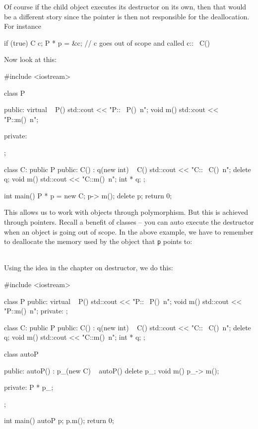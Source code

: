 Of course if the child object executes its destructor on its own, then
that would be a different story since the pointer is then not responsible for
the deallocation. For instance
\begin{console}
if (true)
{   
    C c;
    P * p = &c;
}   // c goes out of scope and called c::~ C()

\newpage{}

Now look at this:

\begin{console}
#include <iostream>

class P
{
public:
     virtual ~ P() { std::cout << "P::~ P()\ n"; }
     void m() { std::cout << "P::m()\ n"; }
     
private:
};

class C: public P
{
public:
     C() : q(new int) {}
     ~ C() { std::cout <<
     "C::~ C()\ n"; delete q; }
     void m() { std::cout << "C::m()\ n"; }
     int * q;
};

int main()
{   
    P * p = new C;
    p-> m();
    delete p;
    return 0;
}
\end{console}

This allows us to work with objects through polymorphism. But this is achieved through pointers. Recall a benefit of classes -- you can auto execute the destructor when an object is going out of scope. In the above example, we have to remember to deallocate the memory used by the object that \texttt{p} points to:

\\

Using the idea in the chapter on destructor, we do this:

\begin{console}
#include <iostream>

class P
{
public:
     virtual ~ P() { std::cout << "P::~ P()\ n"; }
     void m() { std::cout << "P::m()\ n"; }
private:
};

class C: public P
{
public:
     C() : q(new int) {}
     ~ C() { std::cout << "C::~ C()\ n"; delete q; }
     void m() { std::cout << "C::m()\ n"; }
     int * q;
};

class autoP
{
public:
     autoP()
         : p_(new C)
     {}
     ~ autoP()
     { delete p_; }
     void m() { p_-> m(); }
     
private:
     P * p_;
};

int main()
{   
    autoP p;
    p.m();
    return 0;
}
\end{console}


\end{console}
